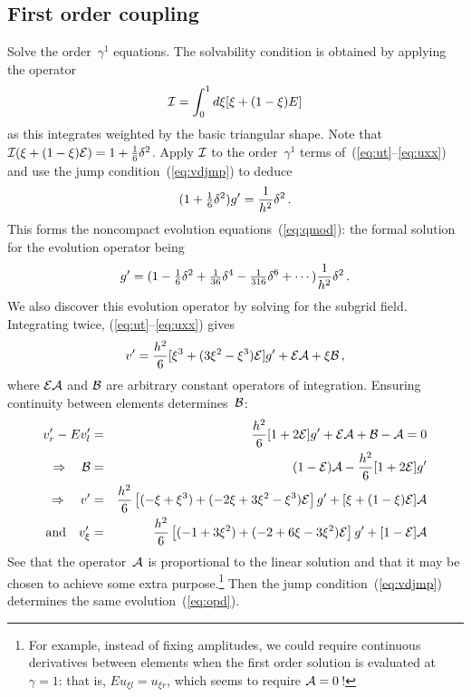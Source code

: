 \documentclass[a5paper]{article}
\newcommand{\cA}{{\cal A}}
\newcommand{\cB}{{\cal B}}
\newcommand{\cE}{{\cal E}}
\newcommand{\cI}{{\cal I}}
\newcommand{\uzero}{\xi+(1-\xi)\cE}
\begin{document}
\subsection{First order coupling}  

Solve the order~$\gamma^1$ equations.
The solvability condition is obtained by applying the operator
\begin{equation}
	\cI=\int_0^1 d\xi[\xi+(1-\xi)E]
	\label{eq:solvo}
\end{equation}
as this integrates weighted by the basic triangular shape.
Note that $\cI(\uzero)=1+\rat16\delta^2$.
Apply $\cI$ to the order~$\gamma^1$ terms 
of~(\ref{eq:ut}--\ref{eq:uxx}) and use the jump 
condition~(\ref{eq:vdjmp}) to deduce
\begin{equation}
	(1+{\textstyle\frac{1}{6}}\delta^2)g'=\frac{1}{h^2}\delta^2\,.
	\label{eq:opd}
\end{equation}
This forms the noncompact evolution equations~(\ref{eq:qmod}): the 
formal solution for the evolution operator being
\begin{equation}
	g'=(1-{\textstyle\frac{1}{6}}\delta^2+{\textstyle\frac{1}{36}}\delta^4-{\textstyle\frac{1}{316}}\delta^6+\cdots)
	\frac{1}{h^2}\delta^2\,.
	\label{eq:opdf}
\end{equation}
We also discover this evolution operator by solving for the subgrid 
field.  Integrating twice, (\ref{eq:ut}--\ref{eq:uxx}) gives
\begin{displaymath}
	v'=\frac{h^2}{6}[\xi^3+(3\xi^2-\xi^3)\cE]g'+\cE\cA+\xi\cB\,,
\end{displaymath}
where $\cE\cA$ and $\cB$ are arbitrary constant operators of 
integration.  Ensuring continuity between elements determines~$\cB$:
\begin{eqnarray*}
	v'_r-Ev'_l & = & \frac{h^2}{6}[1+2\cE]g'+\cE\cA+\cB
	-\cA=0\\
	\Rightarrow\quad\cB & = & (1-\cE)\cA -\frac{h^2}{6}[1+2\cE]g' \\
	\Rightarrow\quad v' & = & \frac{h^2}{6}\left[(-\xi+\xi^3) 
	+(-2\xi+3\xi^2-\xi^3)\cE\right]g' +[\uzero]\cA \\
	\mbox{and}\quad v'_\xi&=& \frac{h^2}{6}\left[(-1+3\xi^2) 
	+(-2+6\xi-3\xi^2)\cE\right]g' +[1-\cE]\cA
\end{eqnarray*}
See that the operator~$\cA$ is proportional to the linear solution and 
that it may be chosen to achieve some extra purpose.\footnote{For 
example, instead of fixing amplitudes, we could require continuous 
derivatives between elements when the first order solution is 
evaluated at $\gamma=1$: that is, $Eu_{\xi l}=u_{\xi r}$, which seems 
to require $\cA=0$\,!  } Then the jump condition~(\ref{eq:vdjmp}) 
determines the same evolution~(\ref{eq:opd}).
\end{document}

